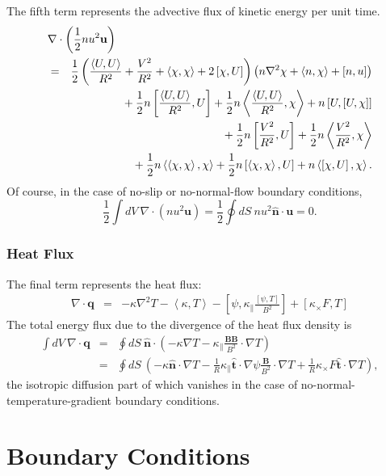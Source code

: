 \documentclass[letterpaper]{book}
\renewcommand{\vec}[1]{\ensuremath{\mathbf{#1}}}
\newcommand{\B}{\vec{B}}
\renewcommand{\u}{\vec{u}}
\newcommand{\q}{\vec{q}}
\newcommand{\grad}[1]{\nabla #1}
\renewcommand{\div}[1]{\nabla \cdot #1}
\newcommand{\lp}[1]{\nabla^2 #1}
\newcommand{\pb}[2]{\left[#1,#2\right]}
\newcommand{\ip}[2]{\left\langle  #1,#2\right\rangle}
\newcommand{\uvec}[1]{\ensuremath{\vec{\hat{#1}}}}
\begin{document}
The fifth term represents the advective flux of kinetic energy per
unit time.
\begin{eqnarray*}
  \lefteqn{\div \left(\frac{1}{2} n u^2 \u \right)}  \\
  & = & 
  \frac{1}{2} \left(\frac{\ip{U}{U}}{R^2} + \frac{V^2}{R^2} +
  \ip{\chi}{\chi} + 2\pb{\chi}{U}\right) \left(n \lp \chi +
  \ip{n}{\chi} + \pb{n}{u} \right) 
   \\ & & \mbox{} 
  + \frac{1}{2} n \pb{\frac{\ip{U}{U}}{R^2}}{U}
  + \frac{1}{2} n \ip{\frac{\ip{U}{U}}{R^2}}{\chi}
  + n \pb{U}{\pb{U}{\chi}}
   \\ & & \mbox{} 
  + \frac{1}{2} n \pb{\frac{V^2}{R^2}}{U}
  + \frac{1}{2} n \ip{\frac{V^2}{R^2}}{\chi}
   \\ & & \mbox{} 
  + \frac{1}{2} n \ip{\ip{\chi}{\chi}}{\chi}
  + \frac{1}{2} n \pb{\ip{\chi}{\chi}}{U}
  + n \ip{\pb{\chi}{U}}{\chi}.
\end{eqnarray*}
Of course, in the case of no-slip or no-normal-flow boundary
conditions, 
\begin{equation}
  \frac{1}{2} \int dV\ \div \left(n u^2 \u\right) = 
  \frac{1}{2} \oint dS\ n u^2 \uvec{n} \cdot \u
  = 0.
\end{equation}


\subsection{Heat Flux}

The final term represents the heat flux:
\begin{eqnarray*}
  \div \q & = & -\kappa \lp{T} - \ip{\kappa}{T} 
  - \pb{\psi}{\kappa_\parallel \frac{\pb{\psi}{T}}{B^2}}
  + \pb{\kappa_\times F}{T}
\end{eqnarray*}
The total energy flux due to the divergence of the heat flux density
is
\begin{eqnarray*}
  \int dV\ \div \q & = & 
  \oint dS\ \uvec{n} \cdot \left(-\kappa \grad T 
   - \kappa_\parallel \frac{\B \B}{B^2} \cdot \grad T\right)
   \\
   & = & \oint dS\ \left(-\kappa \uvec{n} \cdot \grad T 
   - \frac{1}{R} \kappa_\parallel \uvec{t}\cdot \grad \psi 
   \frac{\B}{B^2} \cdot \grad T 
   + \frac{1}{R} \kappa_\times F \uvec{t} \cdot \grad T \right),
\end{eqnarray*}
the isotropic diffusion part of which vanishes in the case of
no-normal-tem\-per\-a\-ture-grad\-i\-ent boundary conditions.


\chapter{Boundary Conditions}
\end{document}
